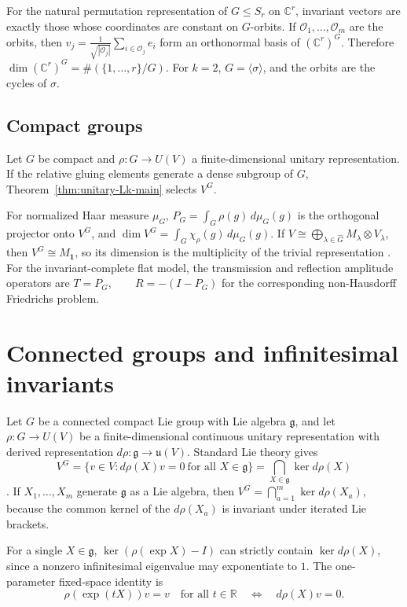 \documentclass[11pt]{article}
\theoremstyle{plain}
\theoremstyle{definition}
\newcommand{\R}{\mathbb{R}}
\newcommand{\C}{\mathbb{C}}
\begin{document}
For the natural permutation representation of
\(G\leq S_r\) on \(\C^r\), invariant vectors are exactly those whose coordinates are constant on \(G\)-orbits. If \(\mathcal O_1,\ldots,\mathcal O_m\) are the orbits, then \(v_j= \frac1{\sqrt{|\mathcal O_j|}} \sum_{i\in\mathcal O_j}e_i\) form an orthonormal basis of \((\C^r)^G\). Therefore
\(\dim(\C^r)^G = \#(\{1,\ldots,r\}/G)\).
For \(k=2\), \(G=\langle\sigma\rangle\), and the orbits are the cycles of \(\sigma\).

\subsection{Compact groups}

Let \(G\) be compact and \(\rho:G\to U(V)\) a finite-dimensional unitary representation. If the relative gluing elements generate a dense subgroup of \(G\), Theorem~\ref{thm:unitary-Lk-main} selects \(V^G\).

For normalized Haar measure \(\mu_G\), \(P_G = \int_G\rho(g)\,d\mu_G(g)\) is the orthogonal projector onto \(V^G\), and
\(\dim V^G = \int_G\chi_\rho(g)\,d\mu_G(g)\).
If
\(V\cong \bigoplus_{\lambda\in\widehat G} M_\lambda\otimes V_\lambda\),
then
\(V^G\cong M_{\mathbf1}\),
so its dimension is the multiplicity of the trivial representation
\citep{Hall2015,BrockerTomDieck1985}. For the invariant-complete flat model, the transmission and reflection amplitude operators are \(T=P_G, \qquad R=-(I-P_G)\) for the corresponding non-Hausdorff Friedrichs problem.

\section{Connected groups and infinitesimal invariants}
\label{sec:lie}

Let \(G\) be a connected compact Lie group with Lie algebra \(\mathfrak g\), and let \(\rho:G\to U(V)\) be a finite-dimensional continuous unitary representation with derived representation
\(d\rho:\mathfrak g\to\mathfrak u(V)\).
Standard Lie theory gives
\[
V^G
=
\{v\in V:d\rho(X)v=0\ \text{for all }X\in\mathfrak g\}
=
\bigcap_{X\in\mathfrak g}\ker d\rho(X)
\]
\citep{Hall2015}. If \(X_1,\ldots,X_m\) generate \(\mathfrak g\) as a Lie algebra, then
\(V^G = \bigcap_{a=1}^{m}\ker d\rho(X_a)\),
because the common kernel of the \(d\rho(X_a)\) is invariant under iterated Lie brackets.

For a single \(X\in\mathfrak g\), \(\ker(\rho(\exp X)-I)\) can strictly contain \(\ker d\rho(X)\), since a nonzero infinitesimal eigenvalue may exponentiate to \(1\). The one-parameter fixed-space identity is
\[
\rho(\exp(tX))v=v\quad\text{for all }t\in\R
\quad\Longleftrightarrow\quad
d\rho(X)v=0.
\]
\end{document}
